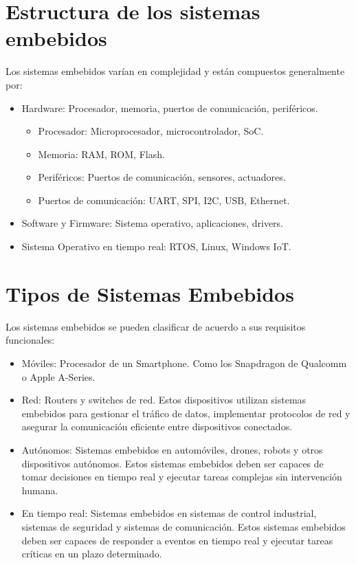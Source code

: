 \documentclass[12pt]{report}
\begin{document}
\section{Estructura de los sistemas embebidos}
Los sistemas embebidos varían en complejidad y están compuestos generalmente por:
\begin{itemize}
  \item Hardware: Procesador, memoria, puertos de comunicación, periféricos.
    \begin{itemize}
      \item Procesador: Microprocesador, microcontrolador, SoC.
      \item Memoria: RAM, ROM, Flash.
      \item Periféricos: Puertos de comunicación, sensores, actuadores.
      \item Puertos de comunicación: UART, SPI, I2C, USB, Ethernet.
    \end{itemize}
  \item Software y Firmware: Sistema operativo, aplicaciones, drivers.
  \item Sistema Operativo en tiempo real: RTOS, Linux, Windows IoT.
  \end{itemize}

\section{Tipos de Sistemas Embebidos}
Los sistemas embebidos se pueden clasificar de acuerdo a sus requisitos funcionales:
\begin{itemize}
  \item Móviles: Procesador de un Smartphone. Como los Snapdragon de Qualcomm o Apple A-Series.
  \item Red: Routers y switches de red. Estos dispositivos utilizan sistemas embebidos para gestionar el tráfico de datos, implementar protocolos de red y asegurar la comunicación eficiente entre dispositivos conectados.
  \item Autónomos: Sistemas embebidos en automóviles, drones, robots y otros dispositivos autónomos. Estos sistemas embebidos deben ser capaces de tomar decisiones en tiempo real y ejecutar tareas complejas sin intervención humana.
  \item En tiempo real: Sistemas embebidos en sistemas de control industrial, sistemas de seguridad y sistemas de comunicación. Estos sistemas embebidos deben ser capaces de responder a eventos en tiempo real y ejecutar tareas críticas en un plazo determinado.
\end{itemize}
\end{document}
